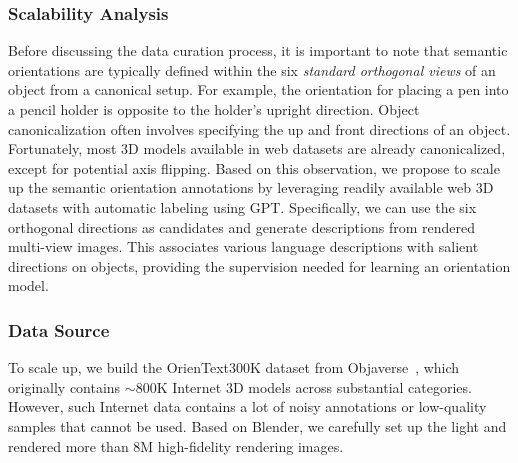 \subsubsection{Scalability Analysis}
Before discussing the data curation process, it is important to note that semantic orientations are typically defined within the six \textit{standard orthogonal views} of an object from a canonical setup. For example, the orientation for placing a pen into a pencil holder is opposite to the holder’s upright direction. Object canonicalization often involves specifying the up and front directions of an object. Fortunately, most 3D models available in web datasets are already canonicalized, except for potential axis flipping. Based on this observation, we propose to scale up the semantic orientation annotations by leveraging readily available web 3D datasets with automatic labeling using GPT. Specifically, we can use the six orthogonal directions as candidates and generate descriptions from rendered multi-view images. This associates various language descriptions with salient directions on objects, providing the supervision needed for learning an orientation model.

\subsubsection{Data Source}\label{sec:objaverse-so}
To scale up, we build the OrienText300K dataset from Objaverse~\cite{objaverse23}, which originally contains $\sim$800K Internet 3D models across substantial categories.
However, such Internet data contains a lot of noisy annotations or low-quality samples that cannot be used. Based on Blender, we carefully set up the light and rendered more than 8M high-fidelity rendering images.

